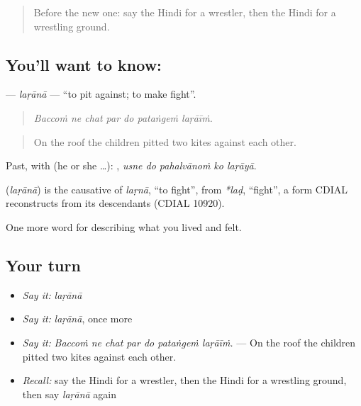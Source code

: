 \label{lesson:HI-C533-larana}



\begin{quote}
Before the new one: say the Hindi for a wrestler, then the Hindi for a wrestling ground.
\end{quote}

\subsection*{You'll want to know: }
\textbf{} — \emph{laṛānā} — \textquotedblleft{}to pit against; to make fight\textquotedblright{}.

\begin{quote}
      
\end{quote}

\begin{quote}
\emph{Baccoṁ ne chat par do pataṅgeṁ laṛāīṁ.}
\end{quote}

\begin{quote}
On the roof the children pitted two kites against each other.
\end{quote}

Past, with  (he or she …):     , \emph{usne do pahalvānoṁ ko laṛāyā}.

\begin{cousinweb}
\textbf{} (\emph{laṛānā}) is the causative of \emph{laṛnā}, \textquotedblleft{}to fight\textquotedblright{}, from \emph{*laḍ}, \textquotedblleft{}fight\textquotedblright{}, a form CDIAL reconstructs from its descendants (CDIAL 10920).
\end{cousinweb}

\begin{grammarlens}[title={What you've built}]
One more word for describing what you lived and felt.
\end{grammarlens}

\subsection*{Your turn}
\begin{itemize}
\raggedright
  \item \emph{Say it:} \emph{laṛānā}
  \item \emph{Say it:} \emph{laṛānā}, once more
  \item \emph{Say it:} \emph{Baccoṁ ne chat par do pataṅgeṁ laṛāīṁ.} — On the roof the children pitted two kites against each other.
  \item \emph{Recall:} say the Hindi for a wrestler, then the Hindi for a wrestling ground, then say \emph{laṛānā} again
\end{itemize}

